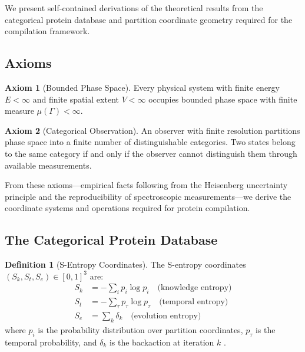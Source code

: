\documentclass[11pt,twocolumn,a4paper]{article}
\theoremstyle{definition}
\newtheorem{definition}[theorem]{Definition}
\newtheorem{axiom}{Axiom}
\theoremstyle{remark}
\newcommand{\Sk}{S_k}
\newcommand{\St}{S_t}
\newcommand{\Se}{S_e}
\begin{document}
We present self-contained derivations of the theoretical results from the categorical protein database \citep{sachikonye2025c} and partition coordinate geometry \citep{sachikonye2025a} required for the compilation framework.

\subsection{Axioms}

\begin{axiom}[Bounded Phase Space]
\label{ax:bounded}
Every physical system with finite energy $E < \infty$ and finite spatial extent $V < \infty$ occupies bounded phase space with finite measure $\mu(\Gamma) < \infty$.
\end{axiom}

\begin{axiom}[Categorical Observation]
\label{ax:categorical}
An observer with finite resolution partitions phase space into a finite number of distinguishable categories. Two states belong to the same category if and only if the observer cannot distinguish them through available measurements.
\end{axiom}

From these axioms---empirical facts following from the Heisenberg uncertainty principle and the reproducibility of spectroscopic measurements---we derive the coordinate systems and operations required for protein compilation.

\subsection{The Categorical Protein Database}

\begin{definition}[S-Entropy Coordinates]
\label{def:s_entropy}
The S-entropy coordinates $(\Sk, \St, \Se) \in [0,1]^3$ are:
\begin{align}
\Sk &= -\sum_{i} p_i \log p_i \quad \text{(knowledge entropy)} \\
\St &= -\sum_{\tau} p_{\tau} \log p_{\tau} \quad \text{(temporal entropy)} \\
\Se &= \sum_k \delta_k \quad \text{(evolution entropy)}
\end{align}
where $p_i$ is the probability distribution over partition coordinates, $p_\tau$ is the temporal probability, and $\delta_k$ is the backaction at iteration $k$ \citep{shannon1948}.
\end{definition}
\end{document}
